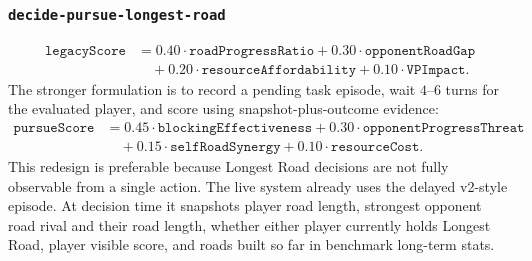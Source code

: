 \documentclass[letter,  12 pt]{article}
\begin{document}
\subsubsection{\texttt{decide-pursue-longest-road}}
\label{app:task-decide-pursue-longest-road}
\[
\begin{aligned}
\texttt{legacyScore}
&= 0.40 \cdot \texttt{roadProgressRatio}
+ 0.30 \cdot \texttt{opponentRoadGap} \\
&\quad + 0.20 \cdot \texttt{resourceAffordability}
+ 0.10 \cdot \texttt{VPImpact}.
\end{aligned}
\]
The stronger formulation is to record a pending task episode, wait $4$--$6$ turns for the evaluated player, and score using snapshot-plus-outcome evidence:
\[
\begin{aligned}
\texttt{pursueScore}
&= 0.45 \cdot \texttt{blockingEffectiveness}
+ 0.30 \cdot \texttt{opponentProgressThreat} \\
&\quad + 0.15 \cdot \texttt{selfRoadSynergy}
+ 0.10 \cdot \texttt{resourceCost}.
\end{aligned}
\]
This redesign is preferable because Longest Road decisions are not fully observable from a single action.
The live system already uses the delayed v2-style episode. At decision time it snapshots player road length, strongest opponent road rival and their road length, whether either player currently holds Longest Road, player visible score, and roads built so far in benchmark long-term stats.
\end{document}
